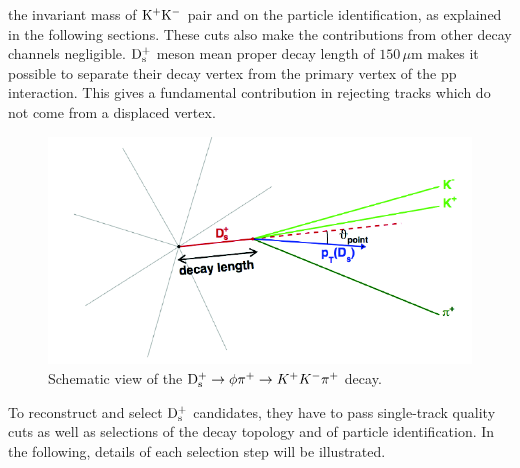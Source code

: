    the invariant mass of ${\rm K^+ K^-}$ pair and on the particle identification, 
   as explained in the following sections. These cuts also make the 
   contributions from other decay channels negligible. 
${\rm D_s^+}$ meson mean proper decay length of $150\, \mu$m  
makes it possible to separate their decay vertex from the primary vertex
of the pp interaction. 
This gives a fundamental contribution in rejecting tracks which do not come from a displaced vertex.
\begin{figure}[!t]
\centering
\includegraphics[width=12cm]{FigCap4/Ds.png}
\caption{Schematic view of the ${\rm D_s^+}\rightarrow \phi \pi^+ \rightarrow K^+K^-\pi^+$ decay.}
\label{fig:DsDecayTopology}
\end{figure}
To reconstruct and select ${\rm D_s^+}$ candidates, they have to pass
single-track quality cuts as well as selections of the decay topology
and of particle identification. In the following, details of each selection step will
be illustrated. 



